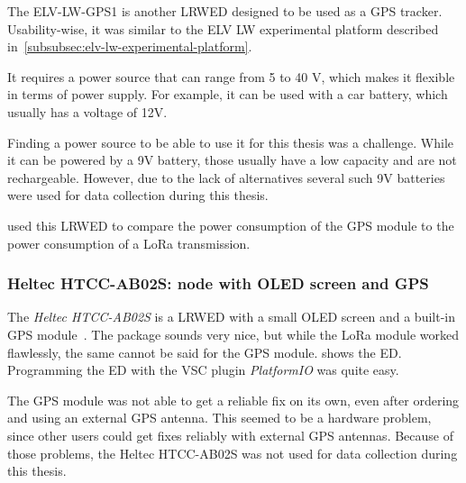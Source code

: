 The ELV-LW-GPS1 is another \acl{LRWED} designed to be used as a \ac{GPS} tracker.
Usability-wise, it was similar to the ELV LW experimental platform described in~\cref{subsubsec:elv-lw-experimental-platform}.

It requires a power source that can range from 5 to 40 V, which makes it flexible in terms of power supply.
For example, it can be used with a car battery, which usually has a voltage of 12V.

Finding a power source to be able to use it for this thesis was a challenge.
While it can be powered by a 9V battery, those usually have a low capacity and are not rechargeable.
However, due to the lack of alternatives several such 9V batteries were used for data collection during this thesis.

 used this \acl{LRWED} to compare the power consumption of the \ac{GPS} module to the power consumption of a \ac{LoRa} transmission.

\subsubsection{Heltec HTCC-AB02S: node with \acs{OLED} screen and \acs{GPS}}\label{subsubsec:heltec-htcc-ab02s}

The \emph{Heltec HTCC-AB02S} is a \acl{LRWED} with a small OLED screen and a built-in \ac{GPS} module~\cite{heltec_automation_cubecell_2020}.
The package sounds very nice, but while the \ac{LoRa} module worked flawlessly, the same cannot be said for the \ac{GPS} module.
 shows the \acl{ED}.
Programming the \acl{ED} with the \ac{VSC} plugin \emph{PlatformIO} was quite easy.

The \ac{GPS} module was not able to get a reliable fix on its own, even after ordering and using an external \ac{GPS} antenna.
This seemed to be a hardware problem, since other users could get fixes reliably with external \ac{GPS} antennas.
Because of those problems, the Heltec HTCC-AB02S was not used for data collection during this thesis.

